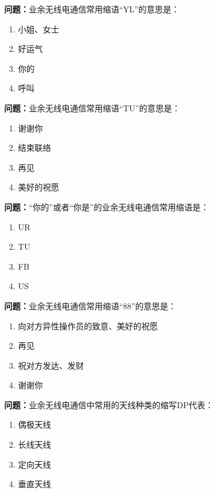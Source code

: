 \bigskip


\noindent\textbf{问题：}业余无线电通信常用缩语“YL”的意思是：
\begin{enumerate}[label=\Alph*), leftmargin=3em]
\item 小姐、女士
\item 好运气
\item 你的
\item 呼叫
\end{enumerate}

\bigskip


\noindent\textbf{问题：}业余无线电通信常用缩语“TU”的意思是：
\begin{enumerate}[label=\Alph*), leftmargin=3em]
\item 谢谢你
\item 结束联络
\item 再见
\item 美好的祝愿
\end{enumerate}

\bigskip


\noindent\textbf{问题：}“你的”或者“你是”的业余无线电通信常用缩语是：
\begin{enumerate}[label=\Alph*), leftmargin=3em]
\item UR
\item TU
\item FB
\item US
\end{enumerate}

\bigskip


\noindent\textbf{问题：}业余无线电通信常用缩语“88”的意思是：
\begin{enumerate}[label=\Alph*), leftmargin=3em]
\item 向对方异性操作员的致意、美好的祝愿
\item 再见
\item 祝对方发达、发财
\item 谢谢你
\end{enumerate}

\bigskip


\noindent\textbf{问题：}业余无线电通信中常用的天线种类的缩写DP代表：
\begin{enumerate}[label=\Alph*), leftmargin=3em]
\item 偶极天线
\item 长线天线
\item 定向天线
\item 垂直天线
\end{enumerate}

\bigskip


